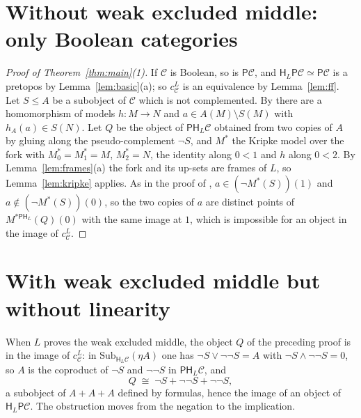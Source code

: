 \documentclass[11pt]{amsart}
\theoremstyle{definition}
\newcommand{\Sub}{\mathrm{Sub}}
\newcommand{\PP}{\mathsf P}
\newcommand{\HH}{\mathsf H}
\newcommand{\cC}{\mathcal C}
\begin{document}
\section{Without weak excluded middle: only Boolean categories}

\begin{proof}[Proof of Theorem~\ref{thm:main}\textup{(1)}]
If $\cC$ is Boolean, so is $\PP\cC$, and $\HH_L\PP\cC\simeq\PP\cC$ is a
pretopos by Lemma~\ref{lem:basic}(a); so $c^L_\cC$ is an equivalence
by Lemma~\ref{lem:ff}. Let $S\le A$ be a subobject of $\cC$ which is
not complemented. By \cite[Lemma~4.1]{Heyting} there are a
homomorphism of models $h\colon M\to N$ and $a\in A(M)\setminus S(M)$
with $h_A(a)\in S(N)$. Let $Q$ be the object of $\PP\HH_L\cC$ obtained
from two copies of $A$ by gluing along the pseudo-complement $\neg S$,
and $M^\ast$ the Kripke model over the fork with $M^\ast_0=M^\ast_1=M$,
$M^\ast_2=N$, the identity along $0<1$ and $h$ along $0<2$. By
Lemma~\ref{lem:frames}(a) the fork and its up-sets are frames of $L$,
so Lemma~\ref{lem:kripke} applies. As in the proof of
\cite[Thm.~1.1]{Heyting}, $a\in(\neg M^\ast(S))(1)$ and
$a\notin(\neg M^\ast(S))(0)$, so the two copies of $a$ are distinct
points of $M^{\ast\PP\HH_L}(Q)(0)$ with the same image at $1$, which is
impossible for an object in the image of $c^L_\cC$.
\end{proof}

\section{With weak excluded middle but without linearity}

When $L$ proves the weak excluded middle, the object $Q$ of the
preceding proof is in the image of $c^L_\cC$: in
$\Sub_{\HH_L\cC}(\eta A)$ one has
$\neg S\vee\neg\neg S=A$ with $\neg S\wedge\neg\neg S=0$, so $A$ is the
coproduct of $\neg S$ and $\neg\neg S$ in $\PP\HH_L\cC$, and
\[
Q\;\cong\;\neg S+\neg\neg S+\neg\neg S,
\]
a subobject of $A+A+A$ defined by formulas, hence the image of an
object of $\HH_L\PP\cC$. The obstruction moves from the negation to
the implication.
\end{document}

